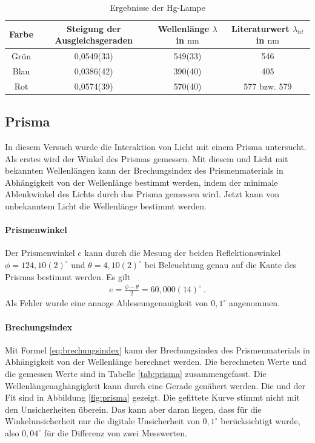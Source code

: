 \documentclass[11pt, a4paper]{article}
\begin{document}
    \begin{table}
        \centering
        \begin{tabular}{c|c|c|c}
            
            Farbe & Steigung der Ausgleichsgeraden & Wellenlänge $\lambda$ in $\si{\nano\metre}$  & Literaturwert  $\lambda_{lit}$ in $\si{\nano\metre}$ \cite{Wiki}\\ \hline
            Grün & 0,0549(33) & 549(33) & 546 \\ \hline
            Blau &  0,0386(42) & 390(40) & 405 \\ \hline
            Rot & 0,0574(39) & 570(40) &577 bzw. 579  \\\hline

        \end{tabular}
        \caption{Ergebnisse der Hg-Lampe}
        \label{tab:Gitter}
    \end{table}

    \subsection{Prisma}
    In diesem Versuch wurde die Interaktion von Licht mit einem Prisma untersucht. Als erstes wird der Winkel des Prismas gemessen. Mit diesem und Licht mit bekannten Wellenlängen kann der Brechungsindex des Prismenmaterials in Abhängigkeit von der Wellenlänge bestimmt werden, indem der minimale Ablenkwinkel des Lichts durch das Prisma gemessen wird. Jetzt kann von unbekanntem Licht die Wellenlänge bestimmt werden.
    \paragraph{Prismenwinkel}
    Der Prismenwinkel $e$ kann durch die Mesung der beiden Reflektionswinkel $\phi = 124,10(2)^{\circ}$ und $\theta = 4,10(2)^{\circ}$ bei Beleuchtung genau auf die Kante des Prismas bestimmt werden. Es gilt
    \begin{align}
        e = \frac{\phi - \theta}{2} = 60,000(14)^{\circ} \label{eq:prisma} \ .
    \end{align}
    Als Fehler wurde eine anaoge Ableseungenauigkeit von $0,1^{\circ}$ angenommen.

    \paragraph{Brechungsindex}
    Mit Formel \ref{eq:brechungsindex} kann der Brechungsindex des Prismenmaterials in Abhängigkeit von der Wellenlänge berechnet werden. Die berechneten Werte und die gemessen Werte sind in Tabelle \ref{tab:prisma} zusammengefasst. Die Wellenlängenaghängigkeit kann durch eine Gerade genähert werden. Die und der Fit sind in Abbildung \ref{fig:prisma} gezeigt. Die gefittete Kurve stimmt nicht mit den Unsicherheiten überein. Das kann aber daran liegen, dass für die Winkelunsicherheit nur die digitale Unsicherheit von $0,1^{\circ}$ berücksichtigt wurde, also $0,04^{\circ}$ für die Differenz von zwei Messwerten.
\end{document}
